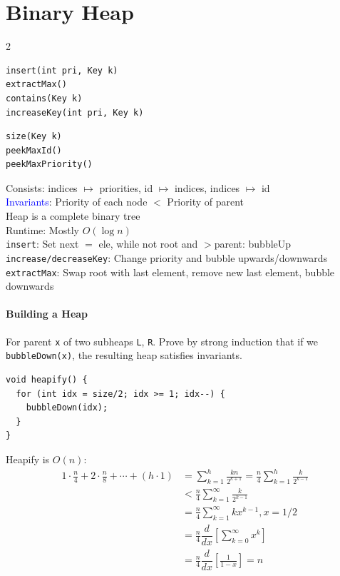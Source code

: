\section{Binary Heap}
\begin{multicols*}{2}
\begin{verbatim}
insert(int pri, Key k)
extractMax()
contains(Key k)
increaseKey(int pri, Key k)
\end{verbatim}
\begin{verbatim}
size(Key k)
peekMaxId()
peekMaxPriority()
\end{verbatim}
\end{multicols*}
Consists: indices $\mapsto$ priorities, id $\mapsto$ indices, indices $\mapsto$ id\\
\textcolor{Blue}{Invariants}: Priority of each node $<$ Priority of parent\\
Heap is a complete binary tree\\
\textcolor{Bittersweet}{Runtime}: Mostly $O(\log n)$\\
\verb|insert|: Set next $=$ ele, while not root and $>$parent: bubbleUp\\
\verb|increase/decreaseKey|: Change priority and bubble upwards/downwards\\
\verb|extractMax|: Swap root with last element, remove new last element, bubble downwards
\paragraph{Building a Heap}
For parent \verb|x| of two subheaps \verb|L|, \verb|R|. Prove by strong
induction that if we \verb|bubbleDown(x)|, the resulting heap satisfies
invariants.
\begin{verbatim}
void heapify() {
  for (int idx = size/2; idx >= 1; idx--) {
    bubbleDown(idx);
  }
}
\end{verbatim}
Heapify is $O(n)$:
\begin{equation*}
  \begin{split}
    1\cdot\frac{n}{4} + 2\cdot\frac{n}{8} + \cdots + (h\cdot 1) &= \sum\limits_{k=1}^{h}\frac{kn}{2^{k+1}}=\frac{n}{4}\sum\limits_{k=1}^{h}\frac{k}{2^{k-1}}\\
    &<\frac{n}{4}\sum\limits_{k=1}^{\infty}\frac{k}{2^{k-1}}\\
    &=\frac{n}{4}\sum\limits_{k=1}^{\infty}kx^{k-1}, x=1/2\\
    &=\frac{n}{4}\dfrac{d}{dx}\left[\sum\limits_{k=0}^{\infty}x^{k}\right]\\
    &=\frac{n}{4}\dfrac{d}{dx}\left[\frac{1}{1-x}\right]=n
  \end{split}
\end{equation*}
